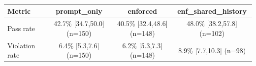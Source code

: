 \begin{tabular}{lccc}
\toprule
Metric & prompt\_only & enforced & enf\_shared\_history \\
\midrule
Pass rate & 42.7\% [34.7,50.0] (n=150) & 40.5\% [32.4,48.6] (n=148) & 48.0\% [38.2,57.8] (n=102) \\
Violation rate & 6.4\% [5.3,7.6] (n=150) & 6.2\% [5.3,7.3] (n=148) & 8.9\% [7.7,10.3] (n=98) \\
\bottomrule
\end{tabular}
